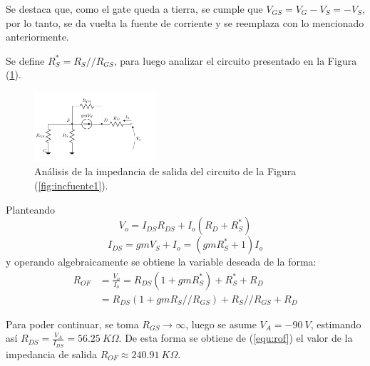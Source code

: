 Se destaca que, como el gate queda a tierra, se cumple que $V_{GS} = V_G - V_S = - V_S$, por lo tanto, se da vuelta la fuente de corriente y se reemplaza con lo mencionado anteriormente. 

Se define $R_S^* = R_S // R_{GS}$, para luego analizar el circuito presentado en la Figura (\ref{fig:incfuente2}).
\begin{figure}[H]
\centering
\hspace*{2cm}
	\includegraphics[width=0.4\textwidth, page=2]{Imagenes/ModeloIncremental.pdf}
	\caption{Análisis de la impedancia de salida del circuito de la Figura (\ref{fig:incfuente1}).}
\label{fig:incfuente2}
\end{figure}

Planteando
\begin{equation*}
	V_o = I_{DS} R_{DS} + I_o \left( R_D + R_S^* \right)
\end{equation*}
\begin{equation*}
	I_{DS} = gm V_S + I_o = \left( gm R_S^* + 1 \right) I_o
\end{equation*}
y operando algebraicamente se obtiene la variable deseada de la forma:
\begin{equation}
\begin{split}
	R_{OF} & = \frac{V_o}{I_o} = R_{DS} \left( 1 + gm R_S^* \right) + R_S^* + R_D \\
		   & = R_{DS} \left( 1 + gm R_S//R_{GS} \right) + R_S//R_{GS} + R_D
\end{split}
\label{equ:rof}
\end{equation}

Para poder continuar, se toma $R_{GS} \longrightarrow \infty$, luego se asume $V_A = -90 \ V$, estimando así $R_{DS} = \frac{V_A}{I_{DS}} = 56.25 \ K\Omega$. De esta forma se obtiene de (\ref{equ:rof}) el valor de la impedancia de salida $R_{OF} \approx 240.91 \ K\Omega$.

